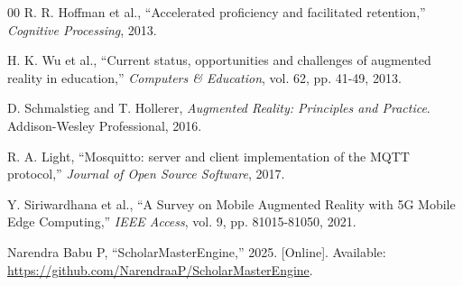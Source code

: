 \documentclass[conference]{IEEEtran}
\begin{document}
\begin{thebibliography}{00}
 R. R. Hoffman et al., ``Accelerated proficiency and facilitated retention,'' \textit{Cognitive Processing}, 2013.

 H. K. Wu et al., ``Current status, opportunities and challenges of augmented reality in education,'' \textit{Computers \& Education}, vol. 62, pp. 41-49, 2013.

 D. Schmalstieg and T. Hollerer, \textit{Augmented Reality: Principles and Practice}. Addison-Wesley Professional, 2016.

 R. A. Light, ``Mosquitto: server and client implementation of the MQTT protocol,'' \textit{Journal of Open Source Software}, 2017.

 Y. Siriwardhana et al., ``A Survey on Mobile Augmented Reality with 5G Mobile Edge Computing,'' \textit{IEEE Access}, vol. 9, pp. 81015-81050, 2021.

 Narendra Babu P, ``ScholarMasterEngine,'' 2025. [Online]. Available: \url{https://github.com/NarendraaP/ScholarMasterEngine}.

\end{thebibliography}
\end{document}
